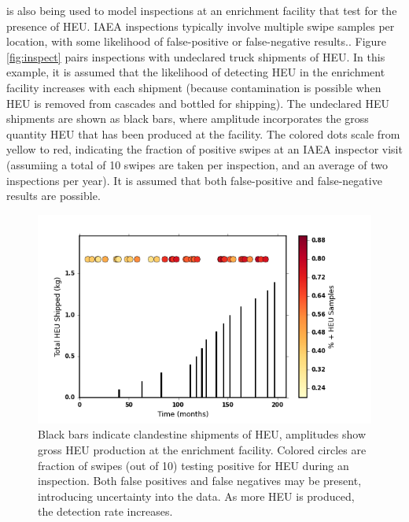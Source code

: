 \Cyclus is also being used to model inspections at an enrichment facility that test for the presence of \gls{HEU}. IAEA inspections typically involve multiple swipe samples per location, with some likelihood of false-positive or false-negative results.\cite{INSPECTION_FALSE?}.  Figure \ref{fig:inspect} pairs inspections with undeclared truck shipments of \gls{HEU}. In this example, it is assumed that the likelihood of detecting \gls{HEU} in the enrichment facility increases with each shipment (because contamination is possible when \gls{HEU} is removed from cascades and bottled for shipping).  The undeclared \gls{HEU} shipments are shown as black bars, where amplitude incorporates the gross quantity \gls{HEU} that has been produced at the facility. The colored dots scale from yellow to red, indicating the fraction of positive swipes at an \gls{IAEA} inspector visit (assumiing a total of 10 swipes are taken per inspection, and an average of two inspections per year).  It is assumed that both false-positive and false-negative results are possible. 

\begin{figure}%
\begin{center}
\includegraphics[natwidth=162bp,natheight=227bp, scale=0.6]{./figs/mm_5enr_lowtails_insp_200yrinspect_ship.png}
\end{center}
\caption{Black bars indicate clandestine shipments of \gls{HEU}, amplitudes show gross \gls{HEU} production at the enrichment facility.  Colored circles are fraction of swipes (out of 10) testing positive for \gls{HEU} during an inspection. Both false positives and false negatives may be present, introducing uncertainty into the data. As more \gls{HEU} is produced, the detection rate increases.}
\label{fig:signatures}
\end{figure}

